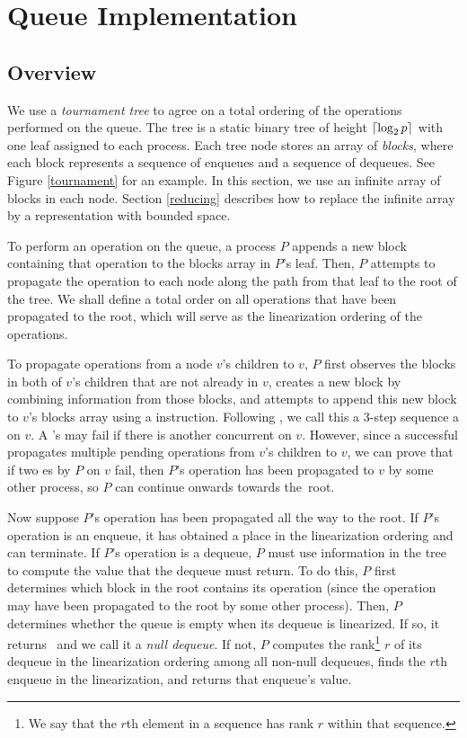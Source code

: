 
\section{Queue Implementation} \label{DescriptQ}

\subsection{Overview}
We use a \emph{tournament tree} to agree on a total ordering of the operations performed on the queue.
The tree is a static binary tree of height $\lceil \log_2 p \rceil$ with one leaf 
assigned to each process. 
Each tree node  stores an array of \emph{blocks}, where each block represents a 
sequence of enqueues and a sequence of dequeues.
See Figure \ref{tournament} for an example.
In this section, we use an infinite array of blocks in each node.
Section \ref{reducing} describes how to replace the infinite array by a representation with bounded space.

To perform an operation on the queue, a process $P$ appends a new block containing that  
operation to the blocks array in $P$'s leaf.
Then, $P$ attempts to propagate the operation to each node along the path from that leaf to the root of the tree.
We shall define a total order on all operations that have been propagated to the root, which 
will serve as the linearization ordering of the operations.

To propagate operations from a node $v$'s children to $v$, $P$ first observes
the blocks in both of $v$'s children that are not already in $v$,
creates a new block by combining information from those blocks, and attempts to append this 
new block to $v$'s blocks array using a  instruction.
Following \cite{DBLP:conf/fsttcs/JayantiP05}, we call this a 3-step sequence a
 on $v$. %
A 's  may fail if there is another concurrent  on $v$.
However, since a successful  propagates multiple pending operations 
from $v$'s children to $v$,
we can prove that if two es by $P$ on $v$ fail,
then $P$'s operation has been propagated to $v$ by some other process, so $P$ can continue 
onwards towards the~root.

Now suppose $P$'s operation has been propagated all the way to the root.
If $P$'s operation is an enqueue, it has obtained a place in the linearization ordering and can terminate.
If $P$'s operation is a dequeue, $P$ must use information in the tree to compute the value that the
dequeue must return.  To do this, $P$ first determines which block in the root contains its operation
(since the operation may have been propagated to the root by some other process).
Then, $P$ determines whether the queue is empty when its dequeue is linearized. 
If so, it returns \nl\ and we call it a \emph{null dequeue}.
If not, $P$ computes the rank\footnote{We say that the $r$th element in a sequence has rank $r$ within that sequence.} $r$ of its dequeue in the linearization ordering
among all non-null dequeues,
finds the $r$th enqueue in the linearization, and returns that enqueue's value.

